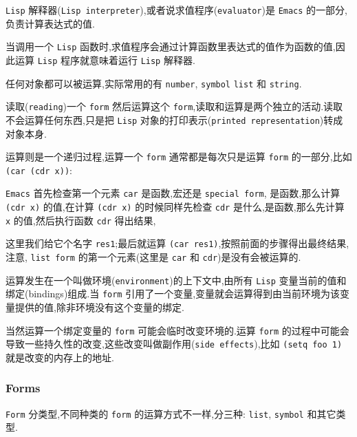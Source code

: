 \documentclass[11pt]{article}
\begin{document}
\texttt{Lisp} 解释器(\texttt{Lisp interpreter}),或者说求值程序(\texttt{evaluator})是 \texttt{Emacs} 的一部分,负责计算表达式的值.

当调用一个 \texttt{Lisp} 函数时,求值程序会通过计算函数里表达式的值作为函数的值,因此运算 \texttt{Lisp} 程序就意味着运行 \texttt{Lisp} 解释器.

任何对象都可以被运算,实际常用的有 \texttt{number}, \texttt{symbol} \texttt{list} 和 \texttt{string}.

读取(\texttt{reading})一个 \texttt{form} 然后运算这个 \texttt{form},读取和运算是两个独立的活动.读取不会运算任何东西,只是把 \texttt{Lisp} 对象的打印表示(\texttt{printed representation})转成对象本身.

运算则是一个递归过程,运算一个 \texttt{form} 通常都是每次只是运算 \texttt{form} 的一部分,比如 \texttt{(car (cdr x))}:

\texttt{Emacs} 首先检查第一个元素 \texttt{car} 是函数,宏还是 \texttt{special form}, 是函数,那么计算 \texttt{(cdr x)} 的值,在计算 \texttt{(cdr x)} 的时候同样先检查 \texttt{cdr} 是什么,是函数,那么先计算 \texttt{x} 的值,然后执行函数 \texttt{cdr} 得出结果,

这里我们给它个名字 \texttt{res1};最后就运算 \texttt{(car res1)},按照前面的步骤得出最终结果,注意, \texttt{list form} 的第一个元素(这里是 \texttt{car} 和 \texttt{cdr})是没有会被运算的.

运算发生在一个叫做环境(\texttt{environment})的上下文中,由所有 \texttt{Lisp} 变量当前的值和绑定(bindings)组成.当 \texttt{form} 引用了一个变量,变量就会运算得到由当前环境为该变量提供的值,除非环境没有这个变量的绑定.

当然运算一个绑定变量的 \texttt{form} 可能会临时改变环境的.运算 \texttt{form} 的过程中可能会导致一些持久性的改变,这些改变叫做副作用(\texttt{side effects}),比如 \texttt{(setq foo 1)} 就是改变的内存上的地址.

\subsubsection{Forms}
\label{sec:orgb13dba3}

\texttt{Form} 分类型,不同种类的 \texttt{form} 的运算方式不一样,分三种: \texttt{list}, \texttt{symbol} 和其它类型.
\end{document}
